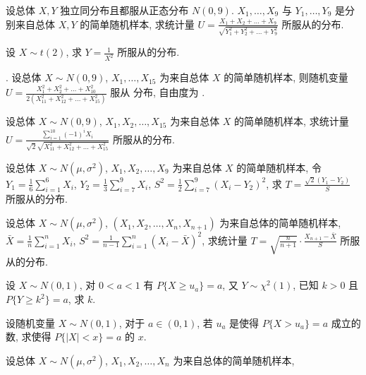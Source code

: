 \documentclass[padp]{ExBook}
\begin{document}
\begin{qitems}
    \begin{bbox}
        \qitem   设总体 $X, Y$ 独立同分布且都服从正态分布 $N(0, 9)$. $X_1, \dots, X_9$ 与 $Y_1, \dots, Y_9$ 是分别来自总体 $X, Y$ 的简单随机样本, 求统计量 $U = \frac{X_1+X_2+\dots+X_9}{\sqrt{Y_1^2+Y_2^2+\dots+Y_9^2}}$ 所服从的分布.
    \end{bbox}
    \begin{bbox}
        \qitem 设 $X \sim t(2)$, 求 $Y = \frac{1}{X^2}$ 所服从的分布.
    \end{bbox}
    \begin{bbox}
        . 设总体 $X \sim N(0, 9)$, $X_1, \dots, X_{15}$ 为来自总体 $X$ 的简单随机样本, 则随机变量 $U = \frac{X_1^2+X_2^2+\dots+X_{10}^2}{2(X_{11}^2+X_{12}^2+\dots+X_{15}^2)}$ 服从 \blankline 分布, 自由度为 \blankline.
    \end{bbox}
    \begin{bbox}
        \qitem 设总体 $X \sim N(0, 9)$, $X_1, X_2, \dots, X_{15}$ 为来自总体 $X$ 的简单随机样本, 求统计量
$U = \frac{\sum_{i=1}^{10}(-1)^i X_i}{\sqrt{2}\sqrt{X_{11}^2+X_{12}^2+\dots+X_{15}^2}}$
所服从的分布.
    \end{bbox}
    \begin{bbox}
        \qitem 设总体 $X \sim N(\mu, \sigma^2)$, $X_1, X_2, \dots, X_9$ 为来自总体 $X$ 的简单随机样本, 令 $Y_1 = \frac{1}{6}\sum_{i=1}^{6}X_i$, $Y_2 = \frac{1}{3}\sum_{i=7}^{9}X_i$, $S^2 = \frac{1}{2}\sum_{i=7}^{9}(X_i - Y_2)^2$, 求 $T = \frac{\sqrt{2}(Y_1-Y_2)}{S}$ 所服从的分布.
    \end{bbox}
    \begin{bbox}
        \qitem  设总体 $X \sim N(\mu, \sigma^2)$, $(X_1, X_2, \dots, X_n, X_{n+1})$ 为来自总体的简单随机样本, $\bar{X} = \frac{1}{n}\sum_{i=1}^{n}X_i$, $S^2 = \frac{1}{n-1}\sum_{i=1}^{n}(X_i - \bar{X})^2$, 求统计量 $T = \sqrt{\frac{n}{n+1}} \cdot \frac{X_{n+1}-\bar{X}}{S}$ 所服从的分布.
    \end{bbox}
    \begin{bbox}
        \qitem 设 $X \sim N(0,1)$, 对 $0 < a < 1$ 有 $P\{X \ge u_a\} = a$, 又 $Y \sim \chi^2(1)$, 已知 $k > 0$ 且 $P\{Y \ge k^2\} = a$, 求 $k$.
    \end{bbox}
    \begin{bbox}
        \qitem 设随机变量 $X \sim N(0,1)$, 对于 $a \in (0,1)$, 若 $u_a$ 是使得 $P\{X > u_a\} = a$ 成立的数, 求使得 $P\{|X| < x\} = a$ 的 $x$.
    \end{bbox}
    \begin{bbox}
        \qitem  设总体 $X \sim N(\mu, \sigma^2)$, $X_1, X_2, \dots, X_n$ 为来自总体的简单随机样本,

\end{bbox}
\end{qitems}
\end{document}
